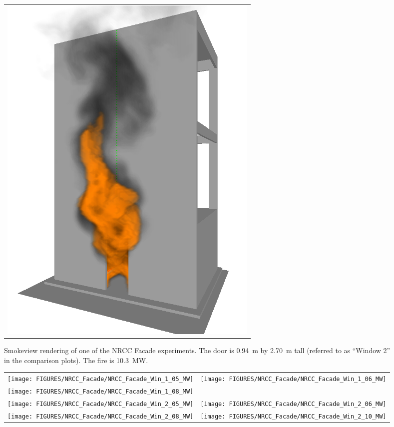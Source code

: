 \begin{figure}[h!]
\begin{center}
\begin{tabular}{c}
\includegraphics[width=5.0in]{FIGURES/NRCC_Facade/NRCC_Facade_Win_2_10_MW_0467}
\end{tabular}
\end{center}
\caption[Smokeview rendering of NRCC Facade experiment]
{Smokeview rendering of one of the NRCC Facade experiments. The door is
0.94~m by 2.70~m tall (referred to as ``Window 2'' in the comparison plots). The
fire is 10.3~MW.}
\label{NRCC_Facade_Image}
\end{figure}

\newpage

\begin{figure}[p]
\begin{tabular*}{\textwidth}{l@{\extracolsep{\fill}}r}
\texttt{[image: FIGURES/NRCC\_Facade/NRCC\_Facade\_Win\_1\_05\_MW]} &
\texttt{[image: FIGURES/NRCC\_Facade/NRCC\_Facade\_Win\_1\_06\_MW]} \\
\texttt{[image: FIGURES/NRCC\_Facade/NRCC\_Facade\_Win\_1\_08\_MW]} &
  \\
\texttt{[image: FIGURES/NRCC\_Facade/NRCC\_Facade\_Win\_2\_05\_MW]} &
\texttt{[image: FIGURES/NRCC\_Facade/NRCC\_Facade\_Win\_2\_06\_MW]} \\
\texttt{[image: FIGURES/NRCC\_Facade/NRCC\_Facade\_Win\_2\_08\_MW]} &
\texttt{[image: FIGURES/NRCC\_Facade/NRCC\_Facade\_Win\_2\_10\_MW]}
\end{tabular*}
\label{NRCC_Facade_1}
\end{figure}

